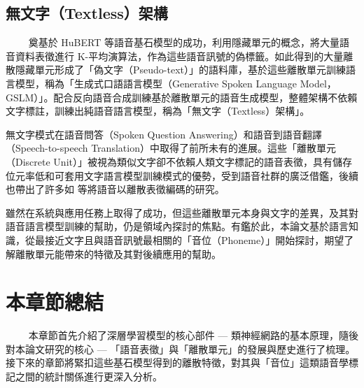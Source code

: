 \subsection{無文字（Textless）架構}
　　
奠基於 HuBERT 等語音基石模型的成功，利用隱藏單元的概念，將大量語音資料表徵進行 K-平均演算法，作為這些語音訊號的偽標籤。如此得到的大量離散隱藏單元形成了「偽文字（Pseudo-text）」的語料庫，基於這些離散單元訓練語言模型，稱為「生成式口語語言模型（Generative Spoken Language Model，GSLM）」\cite{lakhotia_generative_2021-1}。配合反向語音合成訓練基於離散單元的語音生成模型，整體架構不依賴文字標註，訓練出純語音語言模型，稱為「無文字（Textless）架構」\cite{noauthor_textless_2021}。

無文字模式在語音問答（Spoken Question Answering）\cite{lin2022dual}和語音到語音翻譯 （Speech-to-speech Translation）\cite{chen_speech--speech_2023}中取得了前所未有的進展。這些「離散單元（Discrete Unit）」被視為類似文字卻不依賴人類文字標記的語音表徵，具有儲存位元率低和可套用文字語言模型訓練模式的優勢，受到語音社群的廣泛借鑑，後續也帶出了許多如\cite{zhang2024speechtokenizer} 等將語音以離散表徵編碼的研究。

雖然在系統與應用任務上取得了成功，但這些離散單元本身與文字的差異，及其對語音語言模型訓練的幫助，仍是領域內探討的焦點。有鑑於此，本論文基於語言知識，從最接近文字且與語音訊號最相關的「音位（Phoneme）」開始探討，期望了解離散單元能帶來的特徵及其對後續應用的幫助。

\section{本章節總結}
　　
本章節首先介紹了深層學習模型的核心部件 --- 類神經網路的基本原理，隨後對本論文研究的核心 --- 「語音表徵」與「離散單元」的發展與歷史進行了梳理。接下來的章節將緊扣這些基石模型得到的離散特徵，對其與「音位」這類語音學標記之間的統計關係進行更深入分析。
